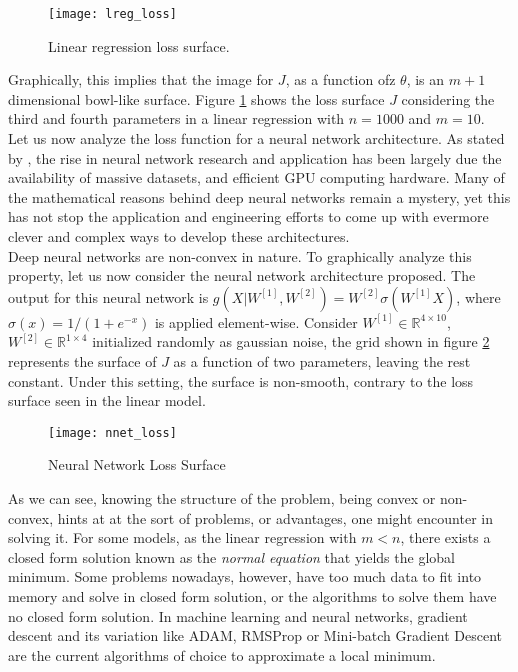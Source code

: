 \documentclass{article}
\newcommand{\rnums}{\mathbb{R}}
\begin{document}
	\begin{figure}[h!]
		\centering
		\texttt{[image: lreg\_loss]}
		\caption{Linear regression loss surface.}
		\label{fig:convex_loss}
	\end{figure}
	
	
	Graphically, this implies that the image for $J$, as a function ofz $\theta$, is an $m + 1$ dimensional bowl-like surface. Figure \ref{fig:convex_loss} shows the loss surface $J$ considering the third and fourth parameters in a linear regression with $n=1000$ and $m=10$.\\
	
	Let us now analyze the loss function for a neural network architecture. As stated by \cite{vidal-et-al}, the rise in neural network research and application has been largely due the availability of massive datasets, and efficient GPU computing hardware. Many of the mathematical reasons behind deep neural networks remain a mystery, yet this has not stop the application and engineering efforts to come up with evermore clever and complex ways to develop these architectures.\\
	
	Deep neural networks are non-convex in nature. To graphically analyze this property, let us now consider the neural network architecture proposed. The output for this neural network is $g(X|W^{[1]}, W^{[2]}) = W^{[2]}\sigma\left(W^{[1]} X\right)$, where $\sigma(x) = 1 / (1 + e^{-x})$ is applied element-wise. Consider $W^{[1]} \in \rnums^{4\times 10}$, $W^{[2]} \in \rnums^{1\times 4}$ initialized randomly as gaussian noise, the grid shown in figure \ref{fig:nonconvex_loss} represents the surface of $J$ as a function of two parameters, leaving the rest constant. Under this setting, the surface is non-smooth, contrary to the loss surface seen in the linear model.\\
		
	\begin{figure}[h!]
		\centering
		\texttt{[image: nnet\_loss]}
		\caption{Neural Network Loss Surface}
		\label{fig:nonconvex_loss}
	\end{figure}
	
	
	As we can see, knowing the structure of the problem, being convex or non-convex, hints at at the sort of problems, or advantages, one might encounter in solving it. For some models, as  the linear regression with $m < n$, there exists a closed form solution known as the \textit{normal equation} that yields the global minimum. Some problems nowadays, however, have too much data to fit into memory and solve in closed form solution, or the algorithms to solve them have no closed form solution. In machine learning and neural networks, gradient descent and its variation like ADAM, RMSProp or Mini-batch Gradient Descent are the current algorithms of choice to approximate a local minimum.\\
	
\end{document}
